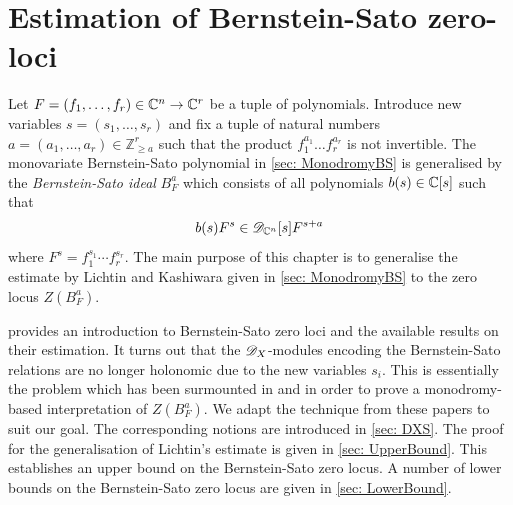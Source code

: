 \chapter{Estimation of Bernstein-Sato zero-loci}\label{ch: ChapterRelHol}
Let $F = (f_1,\ldots,f_r)\in \mathbb{C}^n\to \mathbb{C}^r$ be a tuple of polynomials.
Introduce new variables $s = (s_1,\ldots, s_r)$ and fix a tuple of natural numbers $a = (a_1,\ldots, a_r) \in \mathbb{Z}_{\geq a}^r$ such that the product $f_1^{a_1}\ldots f_r^{a_r}$ is not invertible.
The monovariate Bernstein-Sato polynomial in \cref{sec: MonodromyBS} is generalised by the {\it Bernstein-Sato ideal} $B_F^{a}$ which consists of all polynomials $b(s)\in \mathbb{C}[s]$ such that
$$b(s) F^s \in \mathscr{D}_{\mathbb{C}^n}[s]F^{s+a}$$
where $F^s = f_1^{s_1}\cdots f_r^{s_r}$.
The main purpose of this chapter is to generalise the estimate by Lichtin and Kashiwara given in \cref{sec: MonodromyBS} to the zero locus $Z(B_F^a)$.

 provides an introduction to Bernstein-Sato zero loci and the available results on their estimation.
It turns out that the $\mathscr{D}_X$-modules encoding the Bernstein-Sato relations are no longer holonomic due to the new variables $s_i$.
This is essentially the problem which has been surmounted in \cite{budur2020zeroI} and \cite{budur2020zeroII} in order to prove a monodromy-based interpretation of $Z(B_F^a)$.
We adapt the technique from these papers to suit our goal.
The corresponding notions are introduced in \cref{sec: DXS}.
The proof for the generalisation of Lichtin's estimate is given in \cref{sec: UpperBound}.
This establishes an upper bound on the Bernstein-Sato zero locus.
A number of lower bounds on the Bernstein-Sato zero locus are given in \cref{sec: LowerBound}.
